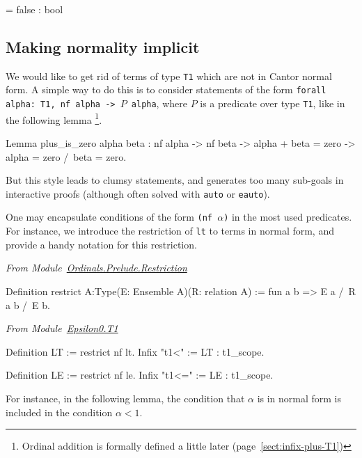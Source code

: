 \documentclass[a4paper]{book}
\begin{document}
\begin{Coqanswer}
   = false 
     : bool
\end{Coqanswer}



\subsection{Making normality implicit}
  We would like to get rid of terms of type \texttt{T1} which are not in Cantor normal form.
A simple way to do this is to consider statements of the form 
\texttt{forall alpha: T1, nf alpha -> $P$ alpha}, where $P$ is a predicate over type \texttt{T1}, like in the following lemma \footnote{Ordinal addition is formally defined a little later (page~\ref{sect:infix-plus-T1})}.

\begin{Coqsrc}
Lemma plus_is_zero alpha beta :
  nf alpha -> nf beta ->
  alpha + beta  = zero -> alpha = zero /\  beta = zero.
\end{Coqsrc}

But this style leads to clumsy statements, and generates too many sub-goals in interactive proofs (although often solved with \texttt{auto} or \texttt{eauto}).

One may encapsulate conditions of the form \texttt{(nf $\alpha$)} in
the most used predicates. For instance, we introduce the restriction of \texttt{lt} to terms in normal form, and provide a handy notation for this restriction.

\vspace{4pt}
\emph{From Module~\href{../src/html/hydras.Prelude.Restriction.html}{Ordinals.Prelude.Restriction}}

\begin{Coqsrc}
Definition restrict {A:Type}(E: Ensemble A)(R: relation A) :=
    fun a b => E a /\ R a b /\ E b.
 \end{Coqsrc}

 
\vspace{4pt}
\emph{From Module~\href{../src/html/hydras.Epsilon0.T1.html\#LT}{Epsilon0.T1}}

\begin{Coqsrc}
Definition LT := restrict nf lt.
Infix "t1<" := LT : t1_scope.

Definition LE := restrict nf le.
Infix "t1<=" := LE : t1_scope.
\end{Coqsrc}


\label{Predicates:LT-T1}
 

For instance, in the following lemma, the condition that $\alpha$ is in normal form is included in the condition $\alpha< 1$.
\end{document}
